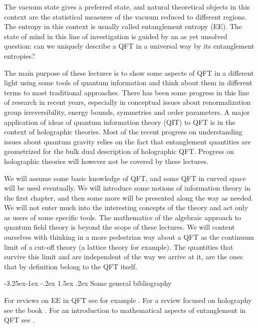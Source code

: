 \documentclass[11pt,a4paper]{article}
\makeatletter
\renewcommand\subsection{\@startsection{subsection}{2}{\z@}%
                                   {-3.25ex\@plus -1ex \@minus -.2ex}%
                                     {1.5ex \@plus .2ex}%
                                     {\normalfont\bfseries}}
\numberwithin{equation}{section}
\makeatother
\begin{document}
The vacuum state gives a preferred state, and natural theoretical objects in this context are the statistical measures of the vacuum reduced to different regions. The entropy in this context is usually called entanglement entropy (EE). The state of mind in this line of investigation is guided by an as yet unsolved question: can we uniquely describe a QFT in a universal way by its entanglement entropies?   
   
The main purpose of these lectures is to show some aspects of QFT in a different light using some tools of quantum information and think about them in different terms to most traditional approaches. There has been some progress in this line of research in recent years, especially in conceptual issues about renormalization group irreversibility, energy bounds, symmetries and order parameters. A major application of ideas of quantum information theory (QIT) to QFT is in the context of holographic theories. Most of the recent progress on understanding issues about quantum gravity relies on the fact that entanglement quantities are geometrized for the bulk dual description of holographic QFT. Progress on holographic theories will however not be covered by these lectures.    

We will assume some basic knowledge of QFT, and some QFT in curved space will be used eventually. We will introduce some notions of information theory in the first chapter, and then some more will be presented along the way as needed. We will not enter much into the interesting concepts of the theory and act only as users of some specific tools. The mathematics of the algebraic approach to quantum field theory is beyond the scope of these lectures. We will content ourselves with thinking in a more pedestrian way about a QFT as the continuum limit of a cut-off theory (a lattice theory for example).  
 The quantities that survive this limit and are independent of the way we arrive at it, are the ones that by definition belong to the QFT itself. 

\subsection{Some general bibliography}

For reviews on EE in QFT see for example \cite{Nishioka:2018khk,Calabrese:2009qy,Casini:2009sr}. 
For a review focused on holography see the book \cite{rangamani2017holographic}.
For an introduction to mathematical aspects of entanglement in QFT see \cite{Witten:2018lha, Hollands:2017dov}.
\end{document}
